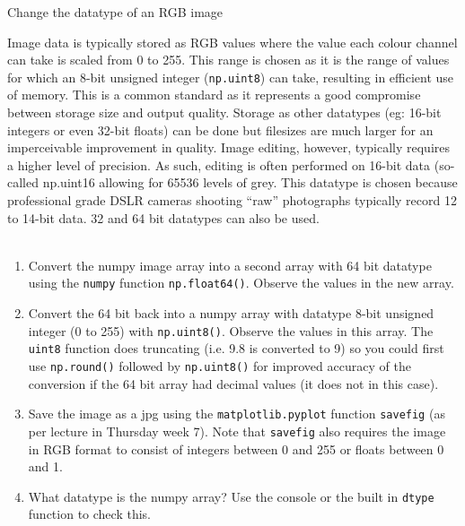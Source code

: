 \documentclass{lab}
\begin{document}
\begin{task}{Change the datatype of an RGB image}{}

Image data is typically stored as RGB values where the value each colour channel can take is scaled from 0 to 255. This range is chosen as it is the range of values for which an 8-bit unsigned integer (\texttt{np.uint8}) can take, resulting in eﬃcient use of memory. This is a common standard as it represents a good compromise between storage size and output quality. Storage as other datatypes (eg: 16-bit integers or even 32-bit ﬂoats) can be done but ﬁlesizes are much larger for an imperceivable improvement in quality.
Image editing, however, typically requires a higher level of precision. As such, editing is often performed on 16-bit data (so-called np.uint16 allowing for 65536 levels of grey. This datatype is chosen because professional grade DSLR cameras shooting “raw” photographs typically record 12 to 14-bit data. 32 and 64 bit datatypes can also be used. \\~

\begin{enumerate}
\item Convert the numpy image array into a second array with 64 bit datatype using the \texttt{numpy} function \texttt{np.float64()}. Observe the values in the new array.
\item Convert the 64 bit back into a numpy array with datatype 8-bit unsigned integer (0 to 255) with \texttt{np.uint8()}. Observe the values in this array. The \texttt{uint8} function does truncating (i.e. 9.8 is converted to 9) so you could first use \texttt{np.round()} followed by \texttt{np.uint8()} for improved accuracy of the conversion if the 64 bit array had decimal values (it does not in this case).
\item Save the image as a jpg using the \texttt{matplotlib.pyplot} function \texttt{savefig} (as per lecture in Thursday week 7). Note that \texttt{savefig} also requires the image in RGB format to consist of integers between 0 and 255 or floats between 0 and 1. 
\item 	What datatype is the numpy array? Use the console or the built in \texttt{dtype} function to check this.
\end{enumerate}

\end{task}
\end{document}
